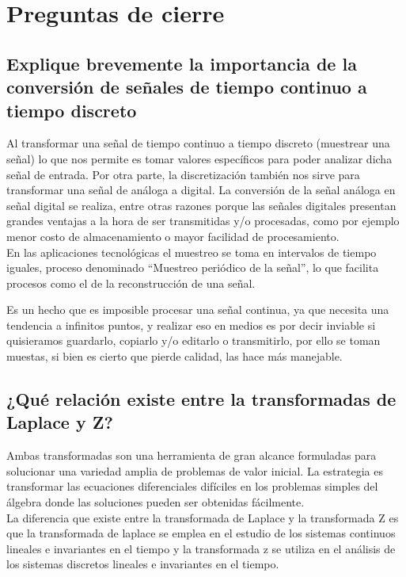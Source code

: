 \section{Preguntas de cierre}

\subsection{Explique brevemente la importancia de la conversión de señales de tiempo continuo a tiempo discreto}

Al transformar una señal de tiempo continuo a tiempo discreto (muestrear una señal) lo que nos permite es tomar valores específicos para poder analizar dicha señal de entrada. Por otra parte, la discretización también nos sirve para transformar una señal de análoga a digital. La conversión de la señal análoga en señal digital se realiza, entre otras razones porque las señales digitales presentan grandes ventajas a la hora de ser transmitidas y/o procesadas, como por ejemplo menor costo de almacenamiento o mayor facilidad de procesamiento.\\
En las aplicaciones tecnológicas el muestreo se toma en intervalos de tiempo iguales, proceso denominado “Muestreo periódico de la señal”, lo que facilita procesos como el de la reconstrucción de una señal.

Es un hecho que es imposible procesar una señal continua, ya que necesita una tendencia a infinitos puntos, y realizar eso en medios es por decir inviable si quisieramos guardarlo, copiarlo y/o editarlo o transmitirlo, por ello se toman muestas, si bien es cierto que pierde calidad, las hace más manejable.


\subsection{¿Qué relación existe entre la transformadas de Laplace y Z?}
Ambas transformadas son una herramienta de gran alcance formuladas para solucionar una variedad amplia de problemas de valor inicial. La estrategia es transformar las ecuaciones diferenciales difíciles en los problemas simples del álgebra donde las soluciones pueden ser obtenidas fácilmente.\\
La diferencia que existe entre la transformada de Laplace y la transformada Z es que la transformada de laplace se emplea en el estudio de los sistemas continuos lineales e invariantes en el tiempo y la transformada z se utiliza en el análisis de los sistemas discretos lineales e invariantes en el tiempo.

